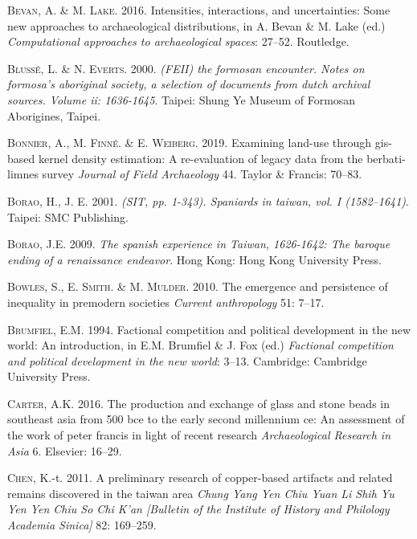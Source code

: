 \documentclass[]{article}
\begin{document}
\leavevmode\hypertarget{ref-Bevan2016}{}%
\textsc{Bevan}, A. \& M. \textsc{Lake}. 2016. Intensities, interactions,
and uncertainties: Some new approaches to archaeological distributions,
in A. Bevan \& M. Lake (ed.) \emph{Computational approaches to
archaeological spaces}: 27--52. Routledge.

\leavevmode\hypertarget{ref-Blusse2000}{}%
\textsc{Blussé}, L. \& N. \textsc{Everts}. 2000. \emph{(FEII) the
formosan encounter. Notes on formosa's aboriginal society, a selection
of documents from dutch archival sources. Volume ii: 1636-1645}. Taipei:
Shung Ye Museum of Formosan Aborigines, Taipei.

\leavevmode\hypertarget{ref-Bonnier2019}{}%
\textsc{Bonnier}, A., M. \textsc{Finné}. \& E. \textsc{Weiberg}. 2019.
Examining land-use through gis-based kernel density estimation: A
re-evaluation of legacy data from the berbati-limnes survey
\emph{Journal of Field Archaeology} 44. Taylor \& Francis: 70--83.

\leavevmode\hypertarget{ref-Borao2001}{}%
\textsc{Borao}, H., J. E. 2001. \emph{(SIT, pp. 1-343). Spaniards in
taiwan, vol. I (1582--1641)}. Taipei: SMC Publishing.

\leavevmode\hypertarget{ref-Borao2009}{}%
\textsc{Borao}, J.E. 2009. \emph{The spanish experience in Taiwan,
1626-1642: The baroque ending of a renaissance endeavor}. Hong Kong:
Hong Kong University Press.

\leavevmode\hypertarget{ref-Bowles2010}{}%
\textsc{Bowles}, S., E. \textsc{Smith}. \& M. \textsc{Mulder}. 2010. The
emergence and persistence of inequality in premodern societies
\emph{Current anthropology} 51: 7--17.

\leavevmode\hypertarget{ref-Brumfiel1994}{}%
\textsc{Brumfiel}, E.M. 1994. Factional competition and political
development in the new world: An introduction, in E.M. Brumfiel \& J.
Fox (ed.) \emph{Factional competition and political development in the
new world}: 3--13. Cambridge: Cambridge University Press.

\leavevmode\hypertarget{ref-Carter2016}{}%
\textsc{Carter}, A.K. 2016. The production and exchange of glass and
stone beads in southeast asia from 500 bce to the early second
millennium ce: An assessment of the work of peter francis in light of
recent research \emph{Archaeological Research in Asia} 6. Elsevier:
16--29.

\leavevmode\hypertarget{ref-Chen2011}{}%
\textsc{Chen}, K.-t. 2011. A preliminary research of copper-based
artifacts and related remains discovered in the taiwan area \emph{Chung
Yang Yen Chiu Yuan Li Shih Yu Yen Yen Chiu So Chi K'an {[}Bulletin of
the Institute of History and Philology Academia Sinica{]}} 82: 169--259.
\end{document}
